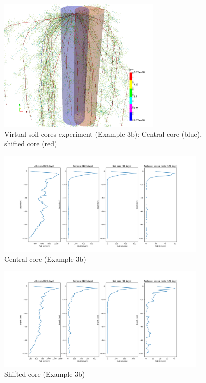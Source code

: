 \begin{figure}
\centering
\includegraphics[width=0.7\textwidth]{example_3d.png} %
\caption{Virtual soil cores experiment (Example 3b): Central core (blue), shifted core (red)} \label{fig:soilcoreGeom}
\end{figure} 

\begin{figure}
\centering
\includegraphics[width=0.9\textwidth]{example_3d1.png} 
\caption{Central core (Example 3b)} \label{fig:central}
\end{figure}

\begin{figure}
\centering
\includegraphics[width=0.9\textwidth]{example_3d2.png} 
\caption{Shifted core (Example 3b)} \label{fig:shifted}
\end{figure}


